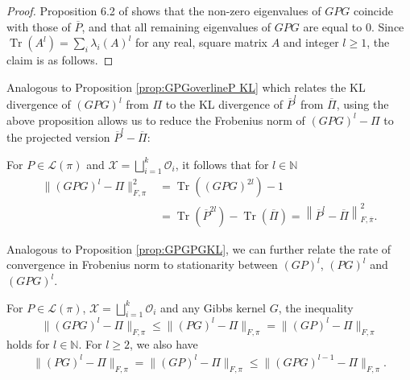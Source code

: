 \documentclass[EJP]{ejpecp} %
\DeclareMathOperator{\Tr}{Tr}
\begin{document}
\begin{proof}
Proposition 6.2 of \cite{GPG} shows that the non-zero eigenvalues of $GPG$ coincide with those of $\overline{P}$, and that all remaining eigenvalues of $GPG$ are equal to $0$.
Since $\Tr(A^l)=\sum_i \lambda_i(A)^l$ for any real, square matrix $A$ and integer $l \geq 1$, the claim is as follows.
\end{proof}

Analogous to Proposition \ref{prop:GPGoverlineP KL} which relates the KL divergence of $(GPG)^l$ from $\Pi$ to the KL divergence of $\overline{P}^l$ from $\overline{\Pi}$, using the above proposition allows us to reduce the Frobenius norm of $(GPG)^l - \Pi$ to the projected version $\overline{P}^l - \overline{\Pi}$:

\begin{corollary} \label{cor:norm GPG}
    For $P \in \mathcal{L}(\pi)$ and $\mathcal{X} = \bigsqcup_{i=1}^k \mathcal{O}_i$, it follows that for $l \in \mathbb{N}$
    \begin{align*}
        \|(GPG)^l - \Pi\|_{F, \pi}^2 &= \Tr((GPG)^{2l})-1 \nonumber\\
        &= \Tr(\overline{P}^{2l}) - \Tr(\overline{\Pi}) = \left\|\overline{P}^l - \overline{\Pi}\right\|^2_{F,\overline{\pi}}.
    \end{align*}
\end{corollary}

Analogous to Proposition \ref{prop:GPGPGKL}, we can further relate the rate of convergence in Frobenius norm to stationarity between $(GP)^l$, $(PG)^l$ and $(GPG)^l.$

\begin{proposition}
    For $P \in \mathcal{L}(\pi)$, $\mathcal{X} = \bigsqcup_{i=1}^k \mathcal{O}_i$ and any Gibbs kernel $G$, the inequality
    $$\|(GPG)^l - \Pi\|_{F, \pi} \leq \|(PG)^l - \Pi\|_{F, \pi} = \|(GP)^l - \Pi\|_{F, \pi}$$
    holds for $l \in \mathbb{N}$. For $l \geq 2$, we also have
    \begin{align*}
         \|(PG)^l - \Pi\|_{F, \pi} = \|(GP)^l - \Pi\|_{F, \pi} \leq \|(GPG)^{l-1} - \Pi\|_{F, \pi}.
    \end{align*}
\end{proposition}
\end{document}
